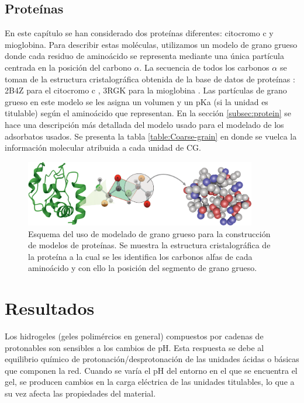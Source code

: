 \subsection{Prote\'inas}

En este cap\'itulo se han considerado dos prote\'inas diferentes: citocromo c y mioglobina.
Para describir estas mol\'eculas, utilizamos un modelo de grano grueso donde cada residuo de amino\'acido se representa mediante una \'unica part\'icula centrada en la posici\'on del carbono $\alpha$.
La secuencia de todos los carbonos $\alpha$ se toman de la estructura cristalogr\'afica obtenida de la base de datos de prote\'inas \cite{berman2000protein}: 2B4Z para el citocromo c \cite{mirkin2008high},  3RGK para la mioglobina \cite{hubbard1990x}.
Las part\'iculas de grano grueso en este modelo se les asigna un volumen y un pKa (si la unidad es titulable) seg\'un el amino\'acido que representan.
En la secci\'on \ref{subsec:protein} se hace una descripci\'on m\'as detallada del modelo usado para el modelado de los adsorbatos usados.  Se presenta la tabla \ref{table:Coarse-grain} en donde se vuelca la informaci\'on molecular atribuida a cada unidad de CG.

\begin{figure}[!htb]
	\centering
	\includegraphics[width=0.9\textwidth]{Figures/modelos/cg_proteinas.png}
	\caption{Esquema del uso de modelado de grano grueso para la construcci\'on de modelos de prote\'inas. Se muestra la estructura cristalogr\'afica de la prote\'ina  a la cual se les identifica los carbonos alfas de cada amino\'acido y con ello la posici\'on del segmento de grano grueso.}
	\label{fig:film:cg_protein}
\end{figure}




\section{Resultados} \label{sec:film:resultados}


Los hidrogeles (geles polim\'ercios en general) compuestos por cadenas de protonables son sensibles a los cambios de pH. Esta respuesta se debe al equilibrio qu\'imico de protonaci\'on/desprotonaci\'on de las unidades \'acidas o b\'asicas que componen la red. Cuando se var\'ia el pH del entorno en el que se encuentra el gel, se producen cambios en la carga el\'ectrica de las unidades titulables, lo que a su vez afecta las propiedades  del material.

